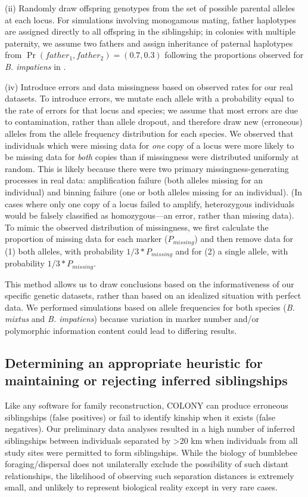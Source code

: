 \documentclass[12pt]{article}
\begin{document}
(ii) Randomly draw offspring genotypes from the set of possible parental alleles at each locus. For simulations involving monogamous mating, father haplotypes are assigned directly to all offspring in the siblingship; in colonies with multiple paternity, we assume two fathers and assign inheritance of paternal haplotypes from $\Pr(father_1, father_2) = (0.7, 0.3)$ following the proportions observed for \emph{B. impatiens} in \textcite{birdMatingFrequencyEstimation2024}.

(iv) Introduce errors and data missingness based on observed rates for our real datasets. To introduce errors, we mutate each allele with a probability equal to the rate of errors for that locus and species; we assume that most errors are due to contamination, rather than allele dropout, and therefore draw new (erroneous) alleles from the allele frequency distribution for each species. We observed that individuals which were missing data for \emph{one} copy of a locus were more likely to be missing data for \emph{both} copies than if missingness were distributed uniformly at random. This is likely because there were two primary missingness-generating processes in real data: amplification failure (both alleles missing for an individual) and binning failure (one or both alleles missing for an individual). (In cases where only one copy of a locus failed to amplify, heterozygous individuals would be falsely classified as homozygous---an error, rather than missing data). To mimic the observed distribution of missingness, we first calculate the proportion of missing data for each marker ($P_{missing}$) and then remove data for (1) both alleles, with probability $1/3 * P_{missing}$ and for (2) a single allele, with probability $1/3 * P_{missing}$.

This method allows us to draw conclusions based on the informativeness of our specific genetic datasets, rather than based on an idealized situation with perfect data. We performed simulations based on allele frequencies for both species (\emph{B. mixtus} and \emph{B. impatiens}) because variation in marker number and/or polymorphic information content could lead to differing results.

\subsection{Determining an appropriate heuristic for maintaining or rejecting inferred siblingships}

Like any software for family reconstruction, COLONY can produce erroneous siblingships (false positives) or fail to identify kinship when it exists (false negatives). Our preliminary data analyses resulted in a high number of inferred siblingships between individuals separated by >20 km when individuals from all study sites were permitted to form siblingships. While the biology of bumblebee foraging/dispersal does not unilaterally exclude the possibility of such distant relationships, the likelihood of observing such separation distances is extremely small, and unlikely to represent biological reality except in very rare cases.
\end{document}
